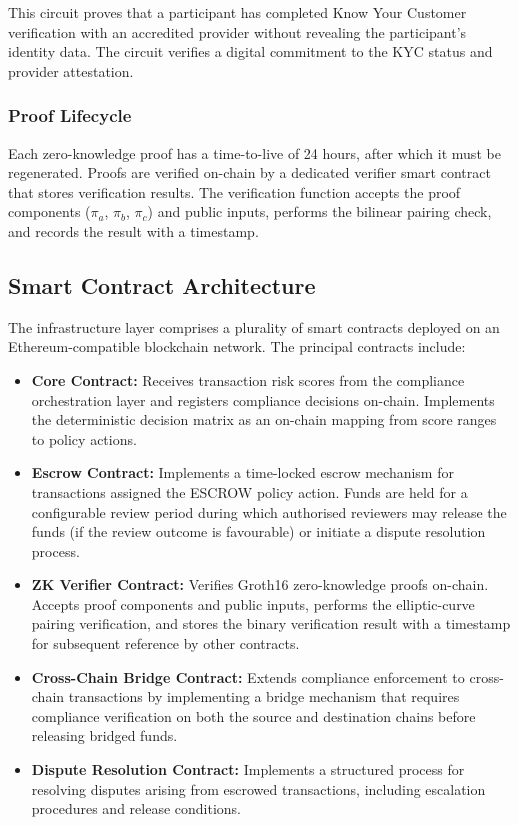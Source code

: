 \documentclass[12pt,a4paper]{article}
\begin{document}
This circuit proves that a participant has completed Know Your Customer 
verification with an accredited provider without revealing the participant's 
identity data. The circuit verifies a digital commitment to the KYC status 
and provider attestation.

\subsubsection{Proof Lifecycle}

Each zero-knowledge proof has a time-to-live of 24 hours, after which it 
must be regenerated. Proofs are verified on-chain by a dedicated verifier 
smart contract that stores verification results. The verification function 
accepts the proof components ($\pi_a$, $\pi_b$, $\pi_c$) and public inputs, 
performs the bilinear pairing check, and records the result with a timestamp.

\subsection{Smart Contract Architecture}

The infrastructure layer comprises a plurality of smart contracts deployed 
on an Ethereum-compatible blockchain network. The principal contracts 
include:

\begin{itemize}
\item \textbf{Core Contract:} Receives transaction risk scores from the 
compliance orchestration layer and registers compliance decisions on-chain. 
Implements the deterministic decision matrix as an on-chain mapping from 
score ranges to policy actions.

\item \textbf{Escrow Contract:} Implements a time-locked escrow mechanism 
for transactions assigned the ESCROW policy action. Funds are held for a 
configurable review period during which authorised reviewers may release the 
funds (if the review outcome is favourable) or initiate a dispute resolution 
process.

\item \textbf{ZK Verifier Contract:} Verifies Groth16 zero-knowledge proofs 
on-chain. Accepts proof components and public inputs, performs the 
elliptic-curve pairing verification, and stores the binary verification 
result with a timestamp for subsequent reference by other contracts.

\item \textbf{Cross-Chain Bridge Contract:} Extends compliance enforcement 
to cross-chain transactions by implementing a bridge mechanism that requires 
compliance verification on both the source and destination chains before 
releasing bridged funds.

\item \textbf{Dispute Resolution Contract:} Implements a structured process 
for resolving disputes arising from escrowed transactions, including 
escalation procedures and release conditions.
\end{itemize}
\end{document}
